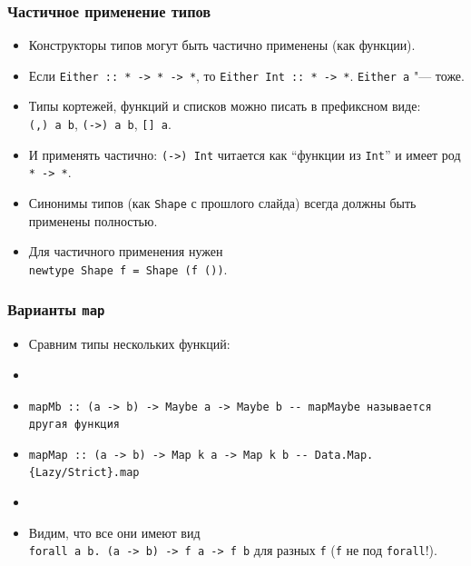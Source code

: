 \documentclass[11pt]{beamer}
\begin{document}
\begin{frame}[fragile]
  \frametitle{Частичное применение типов}
  \begin{itemize}
    \item Конструкторы типов могут быть частично применены (как функции).
    \item Если \lstinline!Either :: * -> * -> *!, то \lstinline|Either Int|\pause\lstinline| :: * -> *|. \lstinline|Either a| "--- тоже.
          \pause
    \item Типы кортежей, функций и списков можно писать в префиксном виде: \\
          \lstinline|(,) a b|, \lstinline|(->) a b|, \lstinline|[] a|.
          \pause
    \item И применять частично: \lstinline|(->) Int| читается как \enquote{функции из \lstinline|Int|} и имеет род \pause\lstinline|* -> *|.
          \pause
    \item Синонимы типов (как \lstinline|Shape| с прошлого слайда) всегда должны быть применены полностью.
          \pause
    \item Для частичного применения нужен \\
          \lstinline|newtype Shape f = Shape (f ())|.
  \end{itemize}
\end{frame}

\begin{frame}[fragile]
  \frametitle{Варианты \lstinline|map|}
  \begin{itemize}
    \item Сравним типы нескольких функций:
    \item {}
          \pause
    \item \lstinline|mapMb :: (a -> b) -> Maybe a -> Maybe b -- mapMaybe называется другая функция|
          \pause
    \item \lstinline|mapMap :: (a -> b) -> Map k a -> Map k b -- Data.Map.{Lazy/Strict}.map|
          \pause
    \item {} \pause
    \item Видим, что все они имеют вид \pause \\
          \lstinline|forall a b. (a -> b) -> f a -> f b| для разных \lstinline|f| (\lstinline|f| не под \lstinline|forall|!).
  \end{itemize}
\end{frame}
\end{document}
